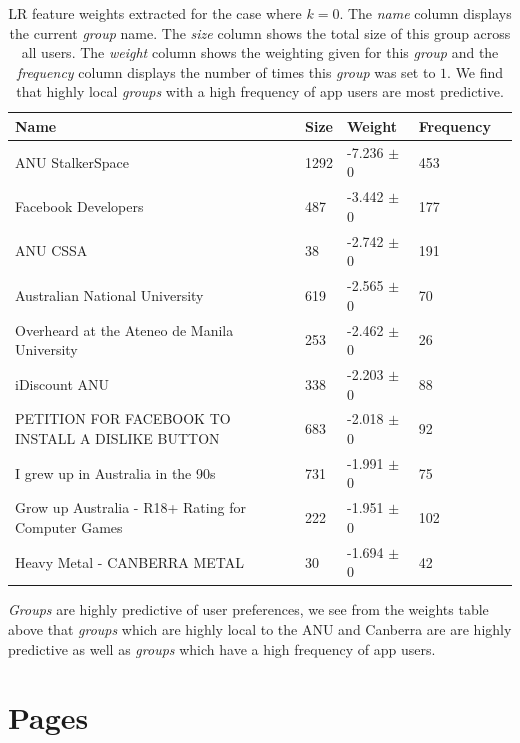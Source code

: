 \begin{table}[h]
\begin{minipage}[b]{1.0\textwidth}
\centering
  \begin{tabular}{|l|l|l|l|l|} %
  \hline
  \textbf{Name} & \textbf{Size} & \textbf{Weight} & \textbf{Frequency} \\ \hline
\small{ANU StalkerSpace} & 1292 & -7.236 $\pm$ 0 & 453 \\ \hline
\small{Facebook Developers} & 487 & -3.442 $\pm$ 0 & 177 \\ \hline
\small{ANU CSSA} & 38 & -2.742 $\pm$ 0 & 191 \\ \hline
\small{Australian National University} & 619 & -2.565 $\pm$ 0 & 70 \\ \hline
\small{Overheard at the Ateneo de Manila University} & 253 & -2.462 $\pm$ 0 & 26 \\ \hline
\small{iDiscount ANU} & 338 & -2.203 $\pm$ 0 & 88 \\ \hline
\small{PETITION FOR FACEBOOK TO INSTALL A DISLIKE BUTTON} & 683 & -2.018 $\pm$ 0 & 92 \\ \hline
\small{I grew up in Australia in the 90s} & 731 & -1.991 $\pm$ 0 & 75 \\ \hline
\small{Grow up Australia - R18+ Rating for Computer Games} & 222 & -1.951 $\pm$ 0 & 102 \\ \hline
\small{Heavy Metal - CANBERRA METAL} & 30 & -1.694 $\pm$ 0 & 42 \\ \hline
  \end{tabular}
  \caption{LR feature weights extracted for the case where $k=0$. The \emph{name} column displays the current \emph{group} name.
  The \emph{size} column shows the total size of this group across all users.
  The \emph{weight} column shows the weighting given for this \emph{group} and the \emph{frequency} column displays the number of times 
  this \emph{group} was set to $1$. We find that highly local \emph{groups} with a high frequency of app users are most predictive.}
\end{minipage}
\end{table}

\emph{Groups} are highly predictive of user preferences, we see from the weights table above that \emph{groups} which are highly local to 
the ANU and Canberra are are highly predictive as well as \emph{groups} which have a high frequency of app users.

\section{Pages}
\label{sec:pages}

